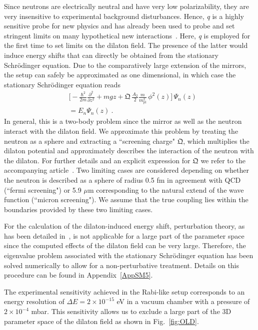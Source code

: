 \documentclass[aps,pra,twocolumn,floatfix,superscriptaddress,nofootinbib,showpacs,a4paper,balancelastpage,twoside]{revtex4-2}
\newcommand{\qbounce}{{\it{q}}{\sc{Bounce}}}				%
\begin{document}
Since neutrons are electrically neutral and have very low polarizability, they are very insensitive to experimental background disturbances. Hence, \qbounce{} is a highly sensitive probe for new physics and has already been used to probe and set stringent limits on many hypothetical new interactions~\cite{Sponar:2020gfr}. Here, \qbounce{} is employed for the first time to set limits on the dilaton field. The presence of the latter would induce energy shifts that can directly be obtained from the stationary Schr\"odinger equation. Due to the comparatively large extension of the mirrors, the setup can safely be approximated as one dimensional, in which case the stationary Schr\"odinger equation reads
\begin{align}
&\bigg[-\frac{\hbar ^2}{2 m} \frac{\partial^2}{\partial z^2}+
  m g z  + \mathfrak{Q}\,\frac{A_2}{2}\frac{m}{m_{\text{pl}}^2}\,\phi^2(z)\bigg]\,\Psi_n(z) \nonumber\\  & = E_n\Psi_n(z)\>.
\end{align}
In general, this is a two-body problem since the mirror as well as the neutron interact with the dilaton field. We approximate this problem by treating the neutron as a sphere and extracting a ``screening charge" $\mathfrak{Q}$, which multiplies the dilaton potential and approximately describes the interaction of the neutron with the dilaton. For further details and an explicit expression for $\mathfrak{Q}$ we refer to the accompanying article~\cite{Brax:2022uyh}. Two limiting cases are considered depending on whether the neutron is described as a sphere of radius 0.5 fm in agreement with QCD (``fermi screening") or 5.9 $\mu$m corresponding to the natural extend of the wave function (``micron screening"). We assume that the true coupling lies within the boundaries provided by these two limiting cases.

For the calculation of the dilaton-induced energy shift, perturbation theory, as has been detailed in~\cite{Brax:2022uyh}, is not applicable for a large part of the parameter space since the computed effects of the dilaton field can be very large. Therefore, the eigenvalue problem associated with the stationary Schr\"odinger equation has been solved numerically to allow for a non-perturbative treatment. Details on this procedure can be found in Appendix~\ref{AppSM5}.

The experimental sensitivity achieved in the Rabi-like setup corresponds to an energy resolution of $\Delta E = 2 \times 10^{-15}$ eV in a vacuum chamber with a pressure of $2 \times 10^{-4}$ mbar. This sensitivity allows us to exclude a large part of the 3D parameter space of the dilaton field as shown in Fig.~\ref{fig:OLD}.
\end{document}
